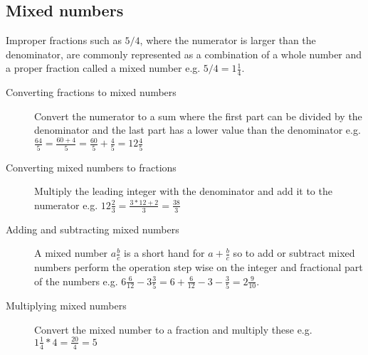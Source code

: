 \subsection{Mixed numbers}
Improper fractions such as $5/4$, where the numerator is larger than the denominator, are commonly represented as a combination of a whole number and a proper fraction called a mixed number e.g. $5/4 = 1\frac{1}{4}$.
\begin{description}
\item [Converting fractions to mixed numbers] Convert the numerator to a sum where the first part can be divided by the denominator and the last part has a lower value than the denominator e.g. $\frac{64}{5} = \frac{60 + 4}{5} = \frac{60}{5} + \frac{4}{5} = 12 \frac{4}{5}$
\item [Converting mixed numbers to fractions] Multiply the leading integer with the denominator and add it to the numerator e.g. $12 \frac{2}{3} = \frac{3 * 12 + 2}{3} = \frac{38}{3}$
\item [Adding and subtracting mixed numbers] A mixed number $a \frac{b}{c}$ is a short hand for $a + \frac{b}{c}$ so to add or subtract mixed numbers perform the operation step wise on the integer and fractional part of the numbers e.g. $6\frac{6}{12} - 3\frac{3}{5} = 6 + \frac{6}{12} - 3 - \frac{3}{5} = 2\frac{9}{10}$.
\item [Multiplying mixed numbers] Convert the mixed number to a fraction and multiply these e.g. $1\frac{1}{4} * 4 = \frac{20}{4} = 5$
\end{description}


